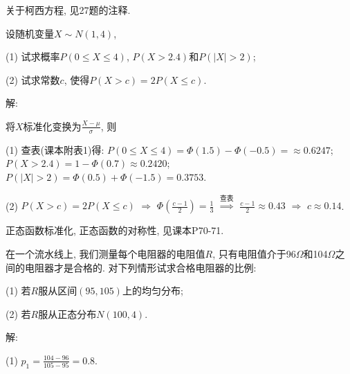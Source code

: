 \documentclass[standard]{ExBook}
\begin{document}
\begin{qitems}
\begin{bbox}
\textcolor{themeColor}{\selectfont {} 关于柯西方程, 见27题的注释.}
    \end{bbox}

\vspace{-5em}

    \begin{bbox}
    \begin{shaded}
        \qitem
设随机变量$X\sim N(1,4)$,

(1) 试求概率$P(0 \leq X \leq 4)$, $P(X>2.4)$和$P(|X|>2)$;

(2) 试求常数$c$, 使得$P(X>c)=2P(X \leq c)$.
    \end{shaded}
    \end{bbox}

\vspace{-5em}

    \begin{bbox}
解: 

将$X$标准化变换为$\displaystyle\frac{X-\mu}{\sigma}$, 则

(1) 查表(课本附表1)得: $P(0\leq X\leq 4)=\Phi(1.5)-\Phi(-0.5)=\approx0.6247$; $P(X>2.4)=1-\Phi(0.7)\approx0.2420$; $P(|X|>2)=\Phi(0.5)+\Phi(-1.5)=0.3753$.

(2) $P(X>c)=2P(X \leq c)$ $\Longrightarrow$ $\Phi(\frac{c-1}{2})=\frac{1}{3}$ $\overset{\text{查表}}{\Longrightarrow}$ $\frac{c-1}{2}\approx0.43$ $\Longrightarrow$ $c\approx0.14$.

\textcolor{themeColor}{\selectfont {} 正态函数标准化, 正态函数的对称性, 见课本P70-71.}
    \end{bbox}

\vspace{-5em}

    \begin{bbox}
    \begin{shaded}
        \qitem
在一个流水线上, 我们测量每个电阻器的电阻值$R$, 只有电阻值介于96$\Omega$和104$\Omega$之间的电阻器才是合格的. 对下列情形试求合格电阻器的比例:

(1) 若$R$服从区间$(95,105)$上的均匀分布;

(2) 若$R$服从正态分布$N(100,4)$.
    \end{shaded}
    \end{bbox}

\vspace{-5em}

    \begin{bbox}
解: 

(1) $p_{1}=\frac{104-96}{105-95}=0.8$.


\end{bbox}
\end{qitems}
\end{document}
